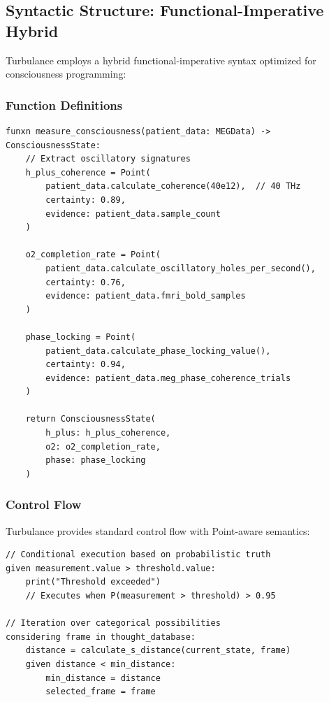 \subsection{Syntactic Structure: Functional-Imperative Hybrid}

Turbulance employs a hybrid functional-imperative syntax optimized for consciousness programming:

\subsubsection{Function Definitions}

\begin{verbatim}
funxn measure_consciousness(patient_data: MEGData) -> ConsciousnessState:
    // Extract oscillatory signatures
    h_plus_coherence = Point(
        patient_data.calculate_coherence(40e12),  // 40 THz
        certainty: 0.89,
        evidence: patient_data.sample_count
    )

    o2_completion_rate = Point(
        patient_data.calculate_oscillatory_holes_per_second(),
        certainty: 0.76,
        evidence: patient_data.fmri_bold_samples
    )

    phase_locking = Point(
        patient_data.calculate_phase_locking_value(),
        certainty: 0.94,
        evidence: patient_data.meg_phase_coherence_trials
    )

    return ConsciousnessState(
        h_plus: h_plus_coherence,
        o2: o2_completion_rate,
        phase: phase_locking
    )
\end{verbatim}

\subsubsection{Control Flow}

Turbulance provides standard control flow with Point-aware semantics:

\begin{verbatim}
// Conditional execution based on probabilistic truth
given measurement.value > threshold.value:
    print("Threshold exceeded")
    // Executes when P(measurement > threshold) > 0.95

// Iteration over categorical possibilities
considering frame in thought_database:
    distance = calculate_s_distance(current_state, frame)
    given distance < min_distance:
        min_distance = distance
        selected_frame = frame
\end{verbatim}

